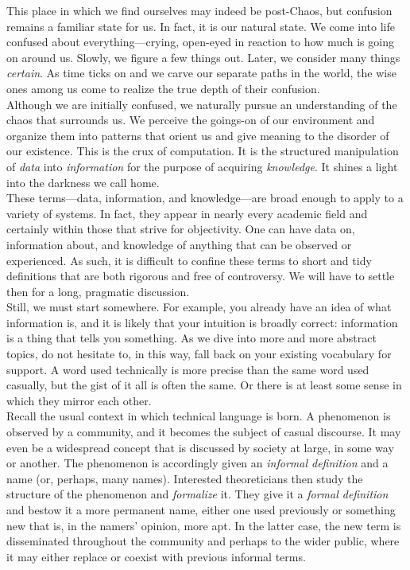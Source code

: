 This place in which we find ourselves may indeed be post-Chaos, but confusion remains a familiar state for us. In fact, it is our natural state. We come into life confused about everything---crying, open-eyed in reaction to how much is going on around us. Slowly, we figure a few things out. Later, we consider many things \textit{certain}. As time ticks on and we carve our separate paths in the world, the wise ones among us come to realize the true depth of their confusion. \\

Although we are initially confused, we naturally pursue an understanding of the chaos that surrounds us. We perceive the goings-on of our environment and organize them into patterns that orient us and give meaning to the disorder of our existence. This is the crux of computation. It is the structured manipulation of \textit{data} into \textit{information} for the purpose of acquiring \textit{knowledge}. It shines a light into the darkness we call home. \\

These terms---data, information, and knowledge---are broad enough to apply to a variety of systems. In fact, they appear in nearly every academic field and certainly within those that strive for objectivity. One can have data on, information about, and knowledge of anything that can be observed or experienced. As such, it is difficult to confine these terms to short and tidy definitions that are both rigorous and free of controversy. We will have to settle then for a long, pragmatic discussion. \\

Still, we must start somewhere. For example, you already have an idea of what information is, and it is likely that your intuition is broadly correct: information is a thing that tells you something. As we dive into more and more abstract topics, do not hesitate to, in this way, fall back on your existing vocabulary for support. A word used technically is more precise than the same word used casually, but the gist of it all is often the same. Or there is at least some sense in which they mirror each other. \\

Recall the usual context in which technical language is born. A phenomenon is observed by a community, and it becomes the subject of casual discourse. It may even be a widespread concept that is discussed by society at large, in some way or another. The phenomenon is accordingly given an \textit{informal definition} and a name (or, perhaps, many names). Interested theoreticians then study the structure of the phenomenon and \textit{formalize} it. They give it a \textit{formal definition} and bestow it a more permanent name, either one used previously or something new that is, in the namers' opinion, more apt. In the latter case, the new term is disseminated throughout the community and perhaps to the wider public, where it may either replace or coexist with previous informal terms. \\

